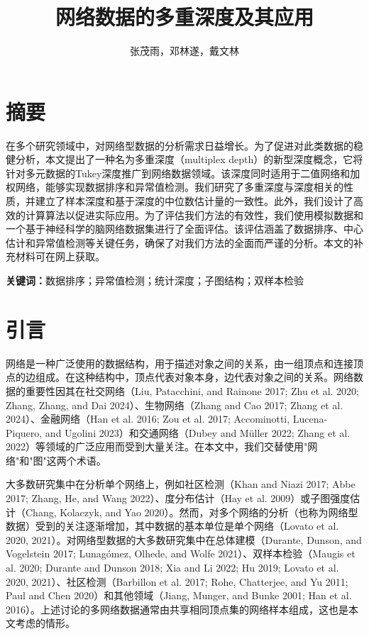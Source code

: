 \documentclass[
  10
]{article}
\author{}
\date{}
\newcounter{none} %
\begin{document}
\title{网络数据的多重深度及其应用}
\author{张茂雨，邓林遂，戴文林}
\maketitle



\section{摘要}

在多个研究领域中，对网络型数据的分析需求日益增长。为了促进对此类数据的稳健分析，本文提出了一种名为多重深度（multiplex depth）的新型深度概念，它将针对多元数据的Tukey深度推广到网络数据领域。该深度同时适用于二值网络和加权网络，能够实现数据排序和异常值检测。我们研究了多重深度与深度相关的性质，并建立了样本深度和基于深度的中位数估计量的一致性。此外，我们设计了高效的计算算法以促进实际应用。为了评估我们方法的有效性，我们使用模拟数据和一个基于神经科学的脑网络数据集进行了全面评估。该评估涵盖了数据排序、中心估计和异常值检测等关键任务，确保了对我们方法的全面而严谨的分析。本文的补充材料可在网上获取。

\noindent\textbf{关键词：}数据排序；异常值检测；统计深度；子图结构；双样本检验

\section{引言}

网络是一种广泛使用的数据结构，用于描述对象之间的关系，由一组顶点和连接顶点的边组成。在这种结构中，顶点代表对象本身，边代表对象之间的关系。网络数据的重要性因其在社交网络（Liu, Patacchini, and Rainone 2017; Zhu et al. 2020; Zhang, Zhang, and Dai 2024）、生物网络（Zhang and Cao 2017; Zhang et al. 2024）、金融网络（Han et al. 2016; Zou et al. 2017; Accominotti, Lucena-Piquero, and Ugolini 2023）和交通网络（Dubey and Müller 2022; Zhang et al. 2022）等领域的广泛应用而受到大量关注。在本文中，我们交替使用"网络"和"图"这两个术语。

大多数研究集中在分析单个网络上，例如社区检测（Khan and Niazi 2017; Abbe 2017; Zhang, He, and Wang 2022）、度分布估计（Hay et al. 2009）或子图强度估计（Chang, Kolaczyk, and Yao 2020）。然而，对多个网络的分析（也称为网络型数据）受到的关注逐渐增加，其中数据的基本单位是单个网络（Lovato et al. 2020, 2021）。对网络型数据的大多数研究集中在总体建模（Durante, Dunson, and Vogelstein 2017; Lunagómez, Olhede, and Wolfe 2021）、双样本检验（Maugis et al. 2020; Durante and Dunson 2018; Xia and Li 2022; Hu 2019; Lovato et al. 2020, 2021）、社区检测（Barbillon et al. 2017; Rohe, Chatterjee, and Yu 2011; Paul and Chen 2020）和其他领域（Jiang, Munger, and Bunke 2001; Han et al. 2016）。上述讨论的多网络数据通常由共享相同顶点集的网络样本组成，这也是本文考虑的情形。
\end{document}
